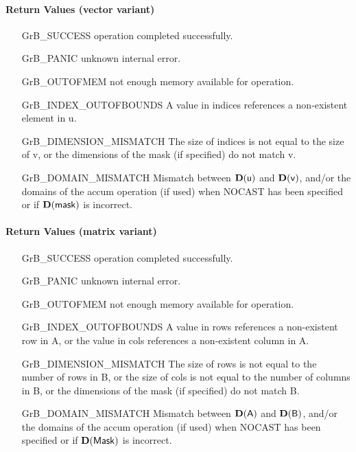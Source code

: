 \paragraph{Return Values (vector variant)}

\begin{itemize}[leftmargin=2.1in]
\item[{\sf GrB\_SUCCESS}]     operation completed successfully.
\item[{\sf GrB\_PANIC}]        unknown internal error.
\item[{\sf GrB\_OUTOFMEM}]    not enough memory available for operation.
\item[{\sf GrB\_INDEX\_OUTOFBOUNDS}]
        A value in {\sf indices} references a non-existent element in {\sf u}.
\item[{\sf GrB\_DIMENSION\_MISMATCH}] 
        The size of {\sf indices} is not equal to the size of {\sf v}, or
        the dimensions of the mask (if specified) do not match {\sf v}.
\item[{\sf GrB\_DOMAIN\_MISMATCH}]    Mismatch between $\bold{D}({\sf u})$ and $\bold{D}({\sf v})$, and/or the domains of the 
                                      {\sf accum} operation (if used) when {\sf NOCAST} has
                                      been specified or if $\bold{D}(\sf mask)$ is incorrect.
\end{itemize}

\paragraph{Return Values (matrix variant)}


\begin{itemize}[leftmargin=2.1in]
\item[{\sf GrB\_SUCCESS}]     operation completed successfully.
\item[{\sf GrB\_PANIC}]        unknown internal error.
\item[{\sf GrB\_OUTOFMEM}]    not enough memory available for operation.
\item[{\sf GrB\_INDEX\_OUTOFBOUNDS}]
        A value in {\sf rows} references a non-existent row in {\sf A}, or
        the value in {\sf cols} references a non-existent column in {\sf A}.
\item[{\sf GrB\_DIMENSION\_MISMATCH}] 
        The size of {\sf rows} is not equal to the number of rows in {\sf B}, or
        the size of {\sf cols} is not equal to the number of columns in {\sf B}, or
        the dimensions of the mask (if specified) do not match {\sf B}.
\item[{\sf GrB\_DOMAIN\_MISMATCH}]    Mismatch between $\bold{D}({\sf A})$ and $\bold{D}({\sf B})$, and/or the domains of the 
                                      {\sf accum} operation (if used) when {\sf NOCAST} has
                                      been specified or if $\bold{D}(\sf Mask)$ is incorrect.
\end{itemize}


